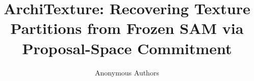 \documentclass{article}
\title{ArchiTexture: Recovering Texture Partitions from Frozen SAM via Proposal-Space Commitment}
\author{Anonymous Authors}
\begin{document}
\maketitle












{\small


}

\clearpage
\appendix

\end{document}
